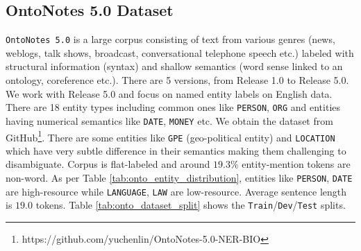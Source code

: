 \subsection{OntoNotes 5.0 Dataset}

\texttt{OntoNotes 5.0}\cite{weischedel2013ontonotes} is a large corpus consisting of text from various genres (news, weblogs, talk shows, broadcast, conversational
telephone speech etc.) labeled with structural information (syntax) and shallow semantics (word sense linked to an ontology, coreference etc.). There are
5 versions, from Release 1.0 to Release 5.0. We work with Release 5.0 and focus on named entity labels on English data. There are 18 entity types including common ones like \texttt{PERSON}, \texttt{ORG} and entities having numerical semantics like \texttt{DATE}, \texttt{MONEY} etc. We obtain the dataset from GitHub\footnote{https://github.com/yuchenlin/OntoNotes-5.0-NER-BIO}. There are some entities like \texttt{GPE} (geo-political entity) and \texttt{LOCATION} which have very subtle difference in their semantics making them challenging to disambiguate. Corpus is flat-labeled and around $19.3\%$  entity-mention tokens are non-word. As per Table \ref{tab:onto_entity_distribution}, entities like \texttt{PERSON}, \texttt{DATE} are high-resource while \texttt{LANGUAGE}, \texttt{LAW} are low-resource. Average sentence length is $19.0$ tokens. Table \ref{tab:onto_dataset_split} shows the \texttt{Train}/\texttt{Dev}/\texttt{Test} splits. 

